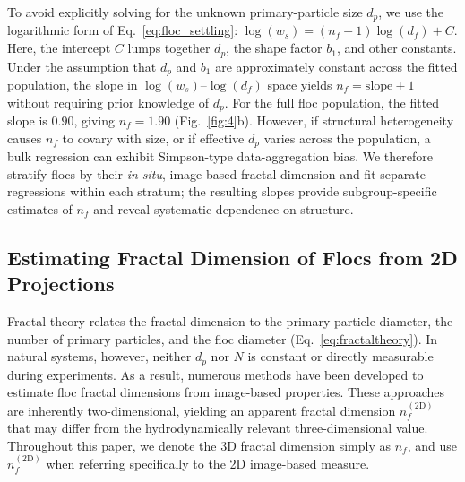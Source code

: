 \documentclass{agujournal2019}
\begin{document}
To avoid explicitly solving for the unknown primary-particle size $d_p$, we use the logarithmic form of Eq.~\eqref{eq:floc_settling}: $\log(w_s) = (n_f - 1)\log(d_f) + C$. Here, the intercept $C$ lumps together $d_p$, the shape factor $b_1$, and other constants. Under the assumption that \(d_p\) and \(b_1\) are approximately constant across the fitted population, the slope in \(\log(w_s)\)--\(\log(d_f)\) space yields \(n_f = \text{slope} + 1\) without requiring prior knowledge of \(d_p\). For the full floc population, the fitted slope is \(0.90\), giving \(n_f = 1.90\) (Fig.~\ref{fig:4}b). However, if structural heterogeneity causes \(n_f\) to covary with size, or if effective \(d_p\) varies across the population, a bulk regression can exhibit Simpson-type data-aggregation bias. We therefore stratify flocs by their \textit{in situ}, image-based fractal dimension and fit separate regressions within each stratum; the resulting slopes provide subgroup-specific estimates of \(n_f\) and reveal systematic dependence on structure.

\subsection{Estimating Fractal Dimension of Flocs from 2D Projections}

Fractal theory relates the fractal dimension to the primary particle diameter, the number of primary particles, and the floc diameter (Eq.~\eqref{eq:fractaltheory}). In natural systems, however, neither $d_p$ nor $N$ is constant or directly measurable during experiments. As a result, numerous methods have been developed to estimate floc fractal dimensions from image-based properties. These approaches are inherently two-dimensional, yielding an apparent fractal dimension $n_f^{(2\mathrm{D})}$ that may differ from the hydrodynamically relevant three-dimensional value. Throughout this paper, we denote the 3D fractal dimension simply as $n_f$, and use $n_f^{(2\mathrm{D})}$ when referring specifically to the 2D image-based measure.
\end{document}
